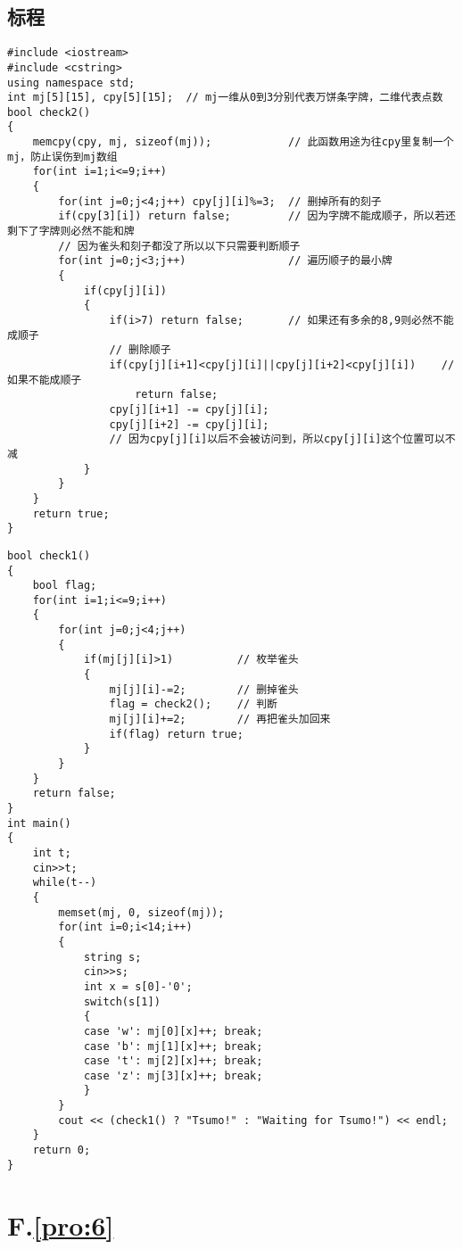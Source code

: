 \documentclass[
	lang=cn,
	color=blue
]{elegantbook}
\begin{document}
\section*{标程}
\begin{lstlisting}
#include <iostream>
#include <cstring>
using namespace std;
int mj[5][15], cpy[5][15];  // mj一维从0到3分别代表万饼条字牌，二维代表点数
bool check2()
{
    memcpy(cpy, mj, sizeof(mj));            // 此函数用途为往cpy里复制一个mj，防止误伤到mj数组
    for(int i=1;i<=9;i++)
    {
        for(int j=0;j<4;j++) cpy[j][i]%=3;  // 删掉所有的刻子
        if(cpy[3][i]) return false;         // 因为字牌不能成顺子，所以若还剩下了字牌则必然不能和牌
        // 因为雀头和刻子都没了所以以下只需要判断顺子
        for(int j=0;j<3;j++)                // 遍历顺子的最小牌
        {
            if(cpy[j][i])
            {
                if(i>7) return false;       // 如果还有多余的8,9则必然不能成顺子
                // 删除顺子
                if(cpy[j][i+1]<cpy[j][i]||cpy[j][i+2]<cpy[j][i])    // 如果不能成顺子
                    return false;
                cpy[j][i+1] -= cpy[j][i];
                cpy[j][i+2] -= cpy[j][i];
                // 因为cpy[j][i]以后不会被访问到，所以cpy[j][i]这个位置可以不减
            }
        }
    }
    return true;
}
\end{lstlisting}
\newpage

\begin{lstlisting}
bool check1()
{
    bool flag;
    for(int i=1;i<=9;i++)
    {
        for(int j=0;j<4;j++)
        {
            if(mj[j][i]>1)          // 枚举雀头
            {
                mj[j][i]-=2;        // 删掉雀头
                flag = check2();    // 判断
                mj[j][i]+=2;        // 再把雀头加回来
                if(flag) return true;
            }
        }
    }
    return false;
}
int main()
{
    int t;
    cin>>t;
    while(t--)
    {
        memset(mj, 0, sizeof(mj));
        for(int i=0;i<14;i++)
        {
            string s;
            cin>>s;
            int x = s[0]-'0';
            switch(s[1])
            {
            case 'w': mj[0][x]++; break;
            case 'b': mj[1][x]++; break;
            case 't': mj[2][x]++; break;
            case 'z': mj[3][x]++; break;
            }
        }
        cout << (check1() ? "Tsumo!" : "Waiting for Tsumo!") << endl;
    }
    return 0;
}
\end{lstlisting}

\chapter*{F.\quad \ref*{pro:6}}
\end{document}

